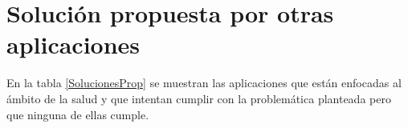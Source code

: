 



\section{Solución propuesta por otras aplicaciones}

En la tabla \ref{SolucionesProp} se muestran las aplicaciones que están enfocadas al ámbito de la salud y que intentan cumplir con la problemática planteada pero que ninguna de ellas cumple.

